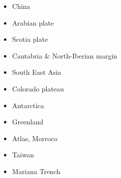 \begin{itemize}
\item China 
{\scriptsize
\cite{zhst10}
\cite{wazh15}
\cite{guyr16}
\cite{dawl20}
}
\item Arabian plate 
{\scriptsize
\cite{rerl15}
}
\item Scotia plate 
{\scriptsize
\cite{necb13}
}
\item Cantabria \& North-Iberian margin 
{\scriptsize
\cite{clbb02}
\cite{peap15}
}
\item South East Asia 
{\scriptsize
\cite{rekv04}
\cite{yotr15}\cite{hasp15}\cite{meds15}
\cite{necg16}
}
\item Colorado plateau 
{\scriptsize
\cite{vabv10}
\cite{lesm11}
}
\item Antarctica  
{\scriptsize
\cite{huha07}
}
\item Greenland  
{\scriptsize
\cite{stsj15}\cite{heps15}\cite{stbl19}
}
\item Atlas, Morroco  
{\scriptsize
\cite{kava14}
}
\item Taiwan  
{\scriptsize
\cite{chys01}\cite{liku16}
}
\item Mariana Trench  
{\scriptsize
\cite{zhlb15}
}


\end{itemize}






